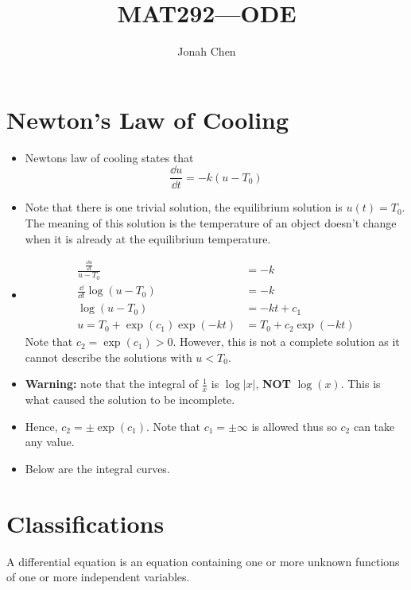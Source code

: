 \documentclass[a4paper, 10pt]{article}
\title{MAT292---ODE}
\author{Jonah Chen}
\numberwithin{equation}{section}
\begin{document}
\sffamily
\maketitle
\tableofcontents

\section{Newton's Law of Cooling}
\begin{itemize}
    \item Newtons law of cooling states that
    \begin{equation}
        \frac{\dd u}{\dd t}=-k(u-T_0)
    \end{equation}
    \item Note that there is one trivial solution, the equilibrium solution is $u(t)=T_0$. The meaning of this solution is the temperature of an object doesn't change when it is already at the equilibrium temperature.
    \item \begin{align}
        \frac{\frac{\dd u}{\dd t}}{u-T_0}&=-k\\
        \frac{\dd}{\dd t}\log(u-T_0)&=-k\\
        \log(u-T_0)&=-kt+c_1\\
        u=T_0+\exp(c_1)\exp(-kt)&=T_0+c_2\exp(-kt)
    \end{align}
    Note that $c_2=\exp(c_1)>0$. However, this is not a complete solution as it cannot describe the solutions with $u<T_0$.
    \item \textbf{Warning:} note that the integral of $\frac{1}{x}$ is $\log|x|$, \textbf{NOT} $\log(x)$. This is what caused the solution to be incomplete.
    \item Hence, $c_2=\pm\exp(c_1)$. Note that $c_1=\pm\infty$ is allowed thus so $c_2$ can take any value.
    \item Below are the integral curves.
\end{itemize}

\section{Classifications}
\begin{definition}
    A differential equation is an equation containing one or more unknown functions of one or more independent variables.
\end{definition}
\end{document}
